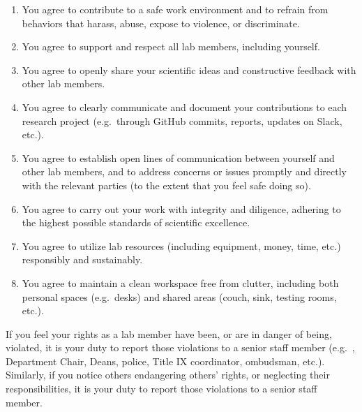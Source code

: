 \documentclass{tufte-book} %
\begin{document}
\begin{enumerate}
  \item You agree to contribute to a safe work environment and to refrain
    from behaviors that harass, abuse, expose to violence, or
    discriminate.
  \item You agree to support and respect all lab members, including
    yourself.
  \item You agree to openly share your scientific ideas and constructive
    feedback with other lab members.
  \item You agree to clearly communicate and document your
    contributions to each research project (e.g.\ through GitHub
    commits, reports, updates on Slack, etc.).
  \item You agree to establish open lines of communication between
    yourself and other lab members, and to address concerns or issues promptly and
    directly with the relevant parties (to the extent that you feel
    safe doing so).
  \item You agree to carry out your work with integrity and diligence,
    adhering to the highest possible standards of scientific
    excellence.
  \item You agree to utilize lab resources (including equipment,
    money, time, etc.) responsibly and sustainably.
  \item You agree to maintain a clean workspace free from clutter,
    including both personal spaces (e.g.\  desks) and shared
    areas (couch, sink, testing rooms, etc.).
\end{enumerate}


\noindent If you feel your rights as a lab member have been, or are in danger of
being, violated, it is your duty to report those violations to a
senior staff member (e.g.\ \director, Department Chair, Deans, police,
Title IX coordinator, ombudsman, etc.).  Similarly, if you notice
others endangering others' rights, or neglecting their
responsibilities, it is your duty to report those violations to a
senior staff member.
\end{document}
